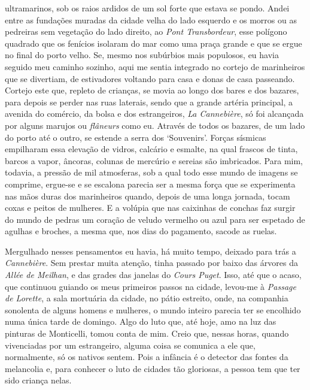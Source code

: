 ultramarinos, sob os raios ardidos de um sol forte que estava se pondo.
Andei entre as fundações muradas da cidade velha do lado esquerdo e os
morros ou as pedreiras sem vegetação do lado direito, ao \emph{Pont
Transbordeur}, esse polígono quadrado que os fenícios isolaram do mar
como uma praça grande e que se ergue no final do porto velho. Se, mesmo
nos subúrbios mais populosos, eu havia seguido meu caminho sozinho, aqui
me sentia integrado no cortejo de marinheiros que se divertiam, de
estivadores voltando para casa e donas de casa passeando. Cortejo este
que, repleto de crianças, se movia ao longo dos bares e dos bazares,
para depois se perder nas ruas laterais, sendo que a grande artéria
principal, a avenida do comércio, da bolsa e dos estrangeiros, \emph{La
Cannebière}, só foi alcançada por alguns marujos ou \emph{flâneurs} como
eu. Através de todos os bazares, de um lado do porto até o outro, se
estende a serra dos `Souvenirs'. Forças sísmicas empilharam essa
elevação de vidros, calcário e esmalte, na qual frascos de tinta, barcos
a vapor, âncoras, colunas de mercúrio e sereias são imbricados. Para
mim, todavia, a pressão de mil atmosferas, sob a qual todo esse mundo de
imagens se comprime, ergue-se e se escalona parecia ser a mesma força
que se experimenta nas mãos duras dos marinheiros quando, depois de uma
longa jornada, tocam coxas e peitos de mulheres. E a volúpia que nas
caixinhas de conchas faz surgir do mundo de pedras um coração de veludo
vermelho ou azul para ser espetado de agulhas e broches, a mesma que,
nos dias do pagamento, sacode as ruelas.

Mergulhado nesses pensamentos eu havia, há muito tempo, deixado para
trás a \emph{Cannebière}. Sem prestar muita atenção, tinha passado por
baixo das árvores da \emph{Allée de Meilhan}, e das grades das janelas
do \emph{Cours Puget}. Isso, até que o acaso, que continuou guiando os
meus primeiros passos na cidade, levou-me à \emph{Passage de Lorette}, a
sala mortuária da cidade, no pátio estreito, onde, na companhia
sonolenta de alguns homens e mulheres, o mundo inteiro parecia ter se
encolhido numa única tarde de domingo. Algo do luto que, até hoje, amo
na luz das pinturas de Monticelli, tomou conta de mim. Creio que, nessas
horas, quando vivenciadas por um estrangeiro, alguma coisa se comunica a
ele que, normalmente, só os nativos sentem. Pois a infância é o detector
das fontes da melancolia e, para conhecer o luto de cidades tão
gloriosas, a pessoa tem que ter sido criança nelas.

